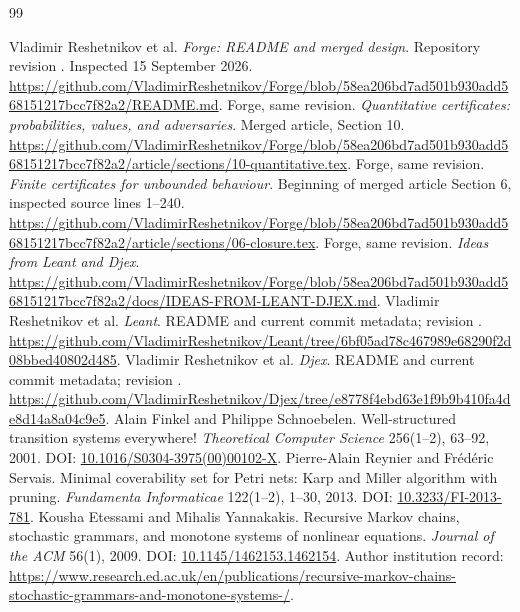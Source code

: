 \begingroup
\small
\begin{thebibliography}{99}
 Vladimir Reshetnikov et al. \emph{Forge: README and merged design}. Repository revision . Inspected 15 September 2026. \url{https://github.com/VladimirReshetnikov/Forge/blob/58ea206bd7ad501b930add568151217bcc7f82a2/README.md}.
 Forge, same revision. \emph{Quantitative certificates: probabilities, values, and adversaries}. Merged article, Section 10. \url{https://github.com/VladimirReshetnikov/Forge/blob/58ea206bd7ad501b930add568151217bcc7f82a2/article/sections/10-quantitative.tex}.
 Forge, same revision. \emph{Finite certificates for unbounded behaviour}. Beginning of merged article Section 6, inspected source lines 1--240. \url{https://github.com/VladimirReshetnikov/Forge/blob/58ea206bd7ad501b930add568151217bcc7f82a2/article/sections/06-closure.tex}.
 Forge, same revision. \emph{Ideas from Leant and Djex}. \url{https://github.com/VladimirReshetnikov/Forge/blob/58ea206bd7ad501b930add568151217bcc7f82a2/docs/IDEAS-FROM-LEANT-DJEX.md}.
 Vladimir Reshetnikov et al. \emph{Leant}. README and current commit metadata; revision . \url{https://github.com/VladimirReshetnikov/Leant/tree/6bf05ad78c467989e68290f2d08bbed40802d485}.
 Vladimir Reshetnikov et al. \emph{Djex}. README and current commit metadata; revision . \url{https://github.com/VladimirReshetnikov/Djex/tree/e8778f4ebd63e1f9b9b410fa4de8d14a8a04c9e5}.
 Alain Finkel and Philippe Schnoebelen. Well-structured transition systems everywhere! \emph{Theoretical Computer Science} 256(1--2), 63--92, 2001. DOI: \href{https://doi.org/10.1016/S0304-3975(00)00102-X}{10.1016/S0304-3975(00)00102-X}.
 Pierre-Alain Reynier and Fr\'ed\'eric Servais. Minimal coverability set for Petri nets: Karp and Miller algorithm with pruning. \emph{Fundamenta Informaticae} 122(1--2), 1--30, 2013. DOI: \href{https://doi.org/10.3233/FI-2013-781}{10.3233/FI-2013-781}.
 Kousha Etessami and Mihalis Yannakakis. Recursive Markov chains, stochastic grammars, and monotone systems of nonlinear equations. \emph{Journal of the ACM} 56(1), 2009. DOI: \href{https://doi.org/10.1145/1462153.1462154}{10.1145/1462153.1462154}. Author institution record: \url{https://www.research.ed.ac.uk/en/publications/recursive-markov-chains-stochastic-grammars-and-monotone-systems-/}.

\end{thebibliography}
